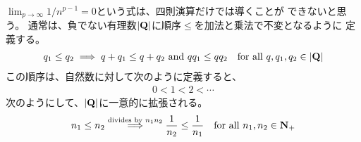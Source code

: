 \begin{description}
\begin{equation*}
\begin{split}
		\end{split}\end{equation*}
		$\lim_{p\to\infty}1/n^{p-1}=0$という式は、四則演算だけでは導くことが
		できないと思う。
		通常は、負でない有理数$|\mathbf{Q}|$に順序$\le$を加法と乗法で不変となるように
		定義する。
		\begin{equation*}\begin{split}
			q_1\le q_2 \implies q + q_1\le q + q_2 \text{ and } qq_1\le qq_2
			\quad\text{for all }q,q_1,q_2\in |\mathbf{Q}|
		\end{split}\end{equation*}
		この順序は、自然数に対して次のように定義すると、
		\begin{equation*}\begin{split}
			0 < 1 < 2 < \cdots
		\end{split}\end{equation*}
		次のようにして、$|\mathbf{Q}|$に一意的に拡張される。
		\begin{equation*}\begin{split}
			n_1\le n_2 \overset{\text{divides by $n_1n_2$}}{\underset{}{\implies}}
			\frac{1}{n_2}\le \frac{1}{n_1}
			\quad\text{for all }n_1,n_2\in\mathbf{N}_+
		\end{split}\end{equation*}
	\end{description} %
\endgroup %
